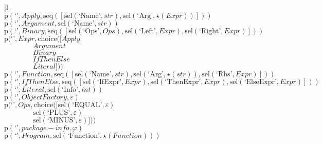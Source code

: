 \footnotesize\begin{center}\begin{tabular}{|l|}\hline
{}
\\\hline
$\mathrm{p}(\text{`'},\mathit{Apply},\mathrm{seq}\left(\left[\mathrm{sel}\left(\text{`Name'},str\right), \mathrm{sel}\left(\text{`Arg'},\star \left(\mathit{Expr}\right)\right)\right]\right))$	\\
$\mathrm{p}(\text{`'},\mathit{Argument},\mathrm{sel}\left(\text{`Name'},str\right))$	\\
$\mathrm{p}(\text{`'},\mathit{Binary},\mathrm{seq}\left(\left[\mathrm{sel}\left(\text{`Ops'},\mathit{Ops}\right), \mathrm{sel}\left(\text{`Left'},\mathit{Expr}\right), \mathrm{sel}\left(\text{`Right'},\mathit{Expr}\right)\right]\right))$	\\
$\mathrm{p}(\text{`'},\mathit{Expr},\mathrm{choice}([\mathit{Apply}$\\$\qquad\qquad\mathit{Argument}$\\$\qquad\qquad\mathit{Binary}$\\$\qquad\qquad\mathit{IfThenElse}$\\$\qquad\qquad\mathit{Literal}]))$	\\
$\mathrm{p}(\text{`'},\mathit{Function},\mathrm{seq}\left(\left[\mathrm{sel}\left(\text{`Name'},str\right), \mathrm{sel}\left(\text{`Arg'},\star \left(str\right)\right), \mathrm{sel}\left(\text{`Rhs'},\mathit{Expr}\right)\right]\right))$	\\
$\mathrm{p}(\text{`'},\mathit{IfThenElse},\mathrm{seq}\left(\left[\mathrm{sel}\left(\text{`IfExpr'},\mathit{Expr}\right), \mathrm{sel}\left(\text{`ThenExpr'},\mathit{Expr}\right), \mathrm{sel}\left(\text{`ElseExpr'},\mathit{Expr}\right)\right]\right))$	\\
$\mathrm{p}(\text{`'},\mathit{Literal},\mathrm{sel}\left(\text{`Info'},int\right))$	\\
$\mathrm{p}(\text{`'},\mathit{ObjectFactory},\varepsilon)$	\\
$\mathrm{p}(\text{`'},\mathit{Ops},\mathrm{choice}([\mathrm{sel}\left(\text{`EQUAL'},\varepsilon\right)$\\$\qquad\qquad\mathrm{sel}\left(\text{`PLUS'},\varepsilon\right)$\\$\qquad\qquad\mathrm{sel}\left(\text{`MINUS'},\varepsilon\right)]))$	\\
$\mathrm{p}(\text{`'},\mathit{package-info},\varphi)$	\\
$\mathrm{p}(\text{`'},\mathit{Program},\mathrm{sel}\left(\text{`Function'},\star \left(\mathit{Function}\right)\right))$	\\
\hline\end{tabular}\end{center}



